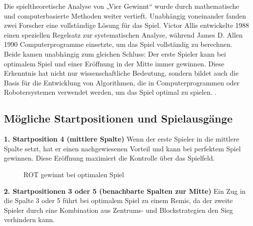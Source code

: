 Die spieltheoretische Analyse von „Vier Gewinnt“ wurde durch mathematische und computerbasierte Methoden weiter vertieft. Unabhängig voneinander fanden zwei Forscher eine vollständige Lösung für das Spiel. Victor Allis entwickelte 1988 einen speziellen Regelsatz zur systematischen Analyse, während James D. Allen 1990 Computerprogramme einsetzte, um das Spiel vollständig zu berechnen. Beide kamen unabhängig zum gleichen Schluss: Der erste Spieler kann bei optimalem Spiel und einer Eröffnung in der Mitte immer gewinnen. Diese Erkenntnis hat nicht nur wissenschaftliche Bedeutung, sondern bildet auch die Basis für die Entwicklung von Algorithmen, die in Computerprogrammen oder Robotersystemen verwendet werden, um das Spiel optimal zu spielen. \autocites{wikipedia_vier_gewinnt}.
	
	\subsection*{Mögliche Startpositionen und Spielausgänge}
	
	\textbf{1. Startposition 4 (mittlere Spalte)}
	Wenn der erste Spieler in die mittlere Spalte setzt, hat er einen nachgewiesenen Vorteil und kann bei perfektem Spiel gewinnen. Diese Eröffnung maximiert die Kontrolle über das Spielfeld.

\begin{figure}[H]
	\centering
{}
  \caption{ROT gewinnt bei optimalen Spiel}
\label{fig:connect4_example}
\end{figure}

	
	
	\textbf{2. Startpositionen 3 oder 5 (benachbarte Spalten zur Mitte)}
	Ein Zug in die Spalte 3 oder 5 führt bei optimalem Spiel zu einem Remis, da der zweite Spieler durch eine Kombination aus Zentrums- und Blockstrategien den Sieg verhindern kann.
	

